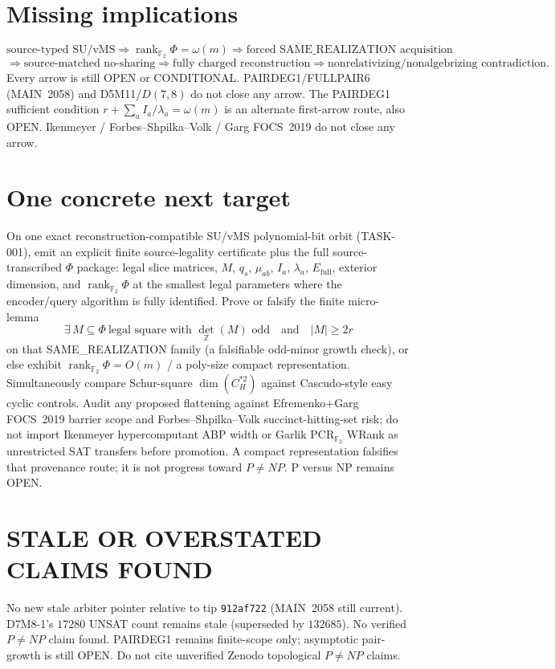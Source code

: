 \documentclass[11pt]{article}
\begin{document}
\section*{Missing implications}
\[
\text{source-typed SU/vMS}
\Longrightarrow
\operatorname{rank}_{\mathbb F_2}\Phi=\omega(m)
\Longrightarrow
\text{forced SAME\_REALIZATION acquisition}
\]
\[
\Longrightarrow
\text{source-matched no-sharing}
\Longrightarrow
\text{fully charged reconstruction}
\Longrightarrow
\text{nonrelativizing/nonalgebrizing contradiction}.
\]
Every arrow is still OPEN or CONDITIONAL. PAIRDEG1/FULLPAIR6 (MAIN~2058) and
D5M11/$D(7,8)$ do not close any arrow. The PAIRDEG1 sufficient condition
$r+\sum_a I_a/\lambda_a=\omega(m)$ is an alternate first-arrow route, also OPEN.
Ikenmeyer / Forbes--Shpilka--Volk / Garg FOCS~2019 do not close any arrow.

\section*{One concrete next target}
On one exact reconstruction-compatible SU/vMS polynomial-bit orbit (TASK-001),
emit an explicit finite source-legality certificate plus the full
source-transcribed $\Phi$ package: legal slice matrices, $M$, $q_s$, $\mu_{ab}$,
$I_a$, $\lambda_a$, $E_{\mathrm{full}}$, exterior dimension, and
$\operatorname{rank}_{\mathbb F_2}\Phi$ at the smallest legal parameters where
the encoder/query algorithm is fully identified. Prove or falsify the finite
micro-lemma
\[
\exists\,M\subseteq\Phi\ \text{legal square with }\det_{\mathbb Z}(M)\text{ odd}
\quad\text{and}\quad |M|\ge 2r
\]
on that SAME\_REALIZATION family (a falsifiable odd-minor growth check), or else
exhibit $\operatorname{rank}_{\mathbb F_2}\Phi=O(m)$ / a poly-size compact
representation. Simultaneously compare Schur-square $\dim(C_H^{*2})$ against
Cascudo-style easy cyclic controls. Audit any proposed flattening against
Efremenko+Garg FOCS~2019 barrier scope and Forbes--Shpilka--Volk succinct-hitting-set
risk; do not import Ikenmeyer hypercomputant ABP width or Garlik PCR$_{\mathbb F_2}$
WRank as unrestricted SAT transfers before promotion. A compact representation
falsifies that provenance route; it is not progress toward $P\neq NP$.
P versus NP remains OPEN.

\section*{STALE OR OVERSTATED CLAIMS FOUND}
No new stale arbiter pointer relative to tip \texttt{912af722} (MAIN~2058 still
current). D7M8-1's $17280$ UNSAT count remains stale (superseded by $132685$).
No verified $P\neq NP$ claim found. PAIRDEG1 remains finite-scope only;
asymptotic pair-growth is still OPEN. Do not cite unverified Zenodo topological
$P\neq NP$ claims.
\end{document}
